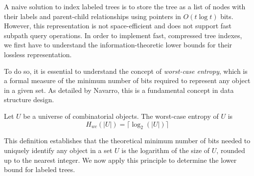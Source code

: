 A naive solution to index labeled trees is to store the tree as a list of nodes with their labels and parent-child relationships using pointers in $O(t \log t)$ bits. However, this representation is not space-efficient and does not support fast subpath query operations.
In order to implement fast, compressed tree indexes, we first have to understand the information-theoretic lower bounds for their lossless representation.
\begin{comment}
    \section{Succinct Data Structures for Trees}
    \alessio{Questa sezione non è ben collegata al resto. Serve questa parentesi sulle SDS? Dato che anche prima parli di minimizzare lo spazio e time optimality, potresti parlare direttamente dei lower bound. Il filo logico sarebbe: "vogliamo fare le cose il meglio possibile, ma quanto vale il meglio?"}
    In order to compress the index of labeled trees, we need to avoid the use of pointers and store the tree in a space-efficient manner. Succinct data structures are a class of compressed data structures that support efficient navigation and query operations on the compressed data. These structures are designed to use close to the information-theoretic lower bound on space while providing fast access to the original data. They were first introduced by Jacobson \cite{jacobson1989space} and have been applied to various problems in string processing, graph theory, and data compression.
\end{comment}
To do so, it is essential to understand the concept of \emph{worst-case entropy}, which is a formal measure of the minimum number of bits required to represent any object in a given set.
As detailed by Navarro\cite{navarro2016compact}, this is a fundamental concept in data structure design.

\begin{definition}
Let $U$ be a universe of combinatorial objects. The worst-case entropy of $U$ is 
$$ H_{wc}(|U|) = \lceil\log_2(|U|)\rceil $$
\end{definition}

This definition establishes that the theoretical minimum number of bits needed to uniquely identify any object in a set $U$ is the logarithm of the size of $U$, rounded up to the nearest integer. We now apply this principle to determine the lower bound for labeled trees.

